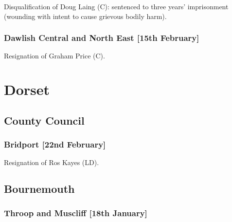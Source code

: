 \documentclass[a4paper,openany]{book}
\begin{document}
\begin{resultsiii}

Disqualification of Doug Laing (C): sentenced to three years' imprisonment (wounding with intent to cause grievous bodily harm).

\subsubsection*{Dawlish Central and North East \hspace*{\fill}\nolinebreak[1]%
\enspace\hspace*{\fill}
[15th February]}


Resignation of Graham Price (C).

\section{Dorset}

\subsection*{County Council}

\subsubsection*{Bridport \hspace*{\fill}\nolinebreak[1]%
\enspace\hspace*{\fill}
[22nd February]}


Resignation of Ros Kayes (LD).

\subsection*{Bournemouth}

\subsubsection*{Throop and Muscliff \hspace*{\fill}\nolinebreak[1]%
\enspace\hspace*{\fill}
[18th January]}



\end{resultsiii}
\end{document}
